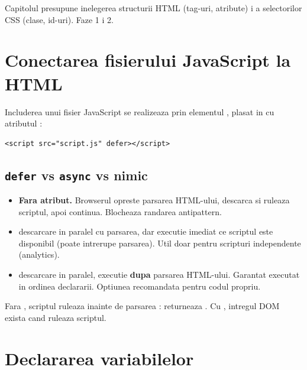 \begin{nota}
Capitolul presupune inelegerea structurii HTML (tag-uri, atribute) i a selectorilor CSS (clase, id-uri). Faze 1 i 2.
\end{nota}

\section{Conectarea fisierului JavaScript la HTML}

Includerea unui fisier JavaScript se realizeaza prin elementul , plasat in  cu atributul :

\begin{lstlisting}[style=html]
<script src="script.js" defer></script>
\end{lstlisting}

\subsection{\texttt{defer} vs \texttt{async} vs nimic}

\begin{itemize}
  \item \textbf{Fara atribut.} Browserul opreste parsarea HTML-ului, descarca si ruleaza scriptul, apoi continua. Blocheaza randarea \textendash{} antipattern.
  \item {} \textendash{} descarcare in paralel cu parsarea, dar executie imediat ce scriptul este disponibil (poate intrerupe parsarea). Util doar pentru scripturi independente (analytics).
  \item {} \textendash{} descarcare in paralel, executie \textbf{dupa} parsarea HTML-ului. Garantat executat in ordinea declararii. Optiunea recomandata pentru codul propriu.
\end{itemize}

\begin{atentie}
Fara , scriptul ruleaza inainte de parsarea :  returneaza . Cu , intregul DOM exista cand ruleaza scriptul.
\end{atentie}

\section{Declararea variabilelor}

